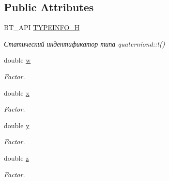 \subsection*{Public Attributes}
\begin{DoxyCompactItemize}
\item 
\hypertarget{classbt_1_1quaterniond_ab576c2aed58d1e3ad8862e273f0ecda3}{B\-T\-\_\-\-A\-P\-I \hyperlink{classbt_1_1quaterniond_ab576c2aed58d1e3ad8862e273f0ecda3}{T\-Y\-P\-E\-I\-N\-F\-O\-\_\-\-H}}\label{classbt_1_1quaterniond_ab576c2aed58d1e3ad8862e273f0ecda3}

\begin{DoxyCompactList}\small\item\em Статический индентификатор типа quaterniond\-::t() \end{DoxyCompactList}\item 
\hypertarget{classbt_1_1quaterniond_a6b08ef016875c7a2d0f3e921065bef29}{double \hyperlink{classbt_1_1quaterniond_a6b08ef016875c7a2d0f3e921065bef29}{w}}\label{classbt_1_1quaterniond_a6b08ef016875c7a2d0f3e921065bef29}

\begin{DoxyCompactList}\small\item\em Factor. \end{DoxyCompactList}\item 
\hypertarget{classbt_1_1quaterniond_ab7baba152e441e9619615cf1e617a205}{double \hyperlink{classbt_1_1quaterniond_ab7baba152e441e9619615cf1e617a205}{x}}\label{classbt_1_1quaterniond_ab7baba152e441e9619615cf1e617a205}

\begin{DoxyCompactList}\small\item\em Factor. \end{DoxyCompactList}\item 
\hypertarget{classbt_1_1quaterniond_a6ef67f3d144022ddbe07b2e3d2516988}{double \hyperlink{classbt_1_1quaterniond_a6ef67f3d144022ddbe07b2e3d2516988}{y}}\label{classbt_1_1quaterniond_a6ef67f3d144022ddbe07b2e3d2516988}

\begin{DoxyCompactList}\small\item\em Factor. \end{DoxyCompactList}\item 
\hypertarget{classbt_1_1quaterniond_a8b76dba9fd88f07a5c53c7b6e71a1d41}{double \hyperlink{classbt_1_1quaterniond_a8b76dba9fd88f07a5c53c7b6e71a1d41}{z}}\label{classbt_1_1quaterniond_a8b76dba9fd88f07a5c53c7b6e71a1d41}

\begin{DoxyCompactList}\small\item\em Factor. \end{DoxyCompactList}\end{DoxyCompactItemize}
